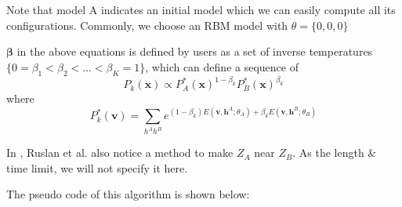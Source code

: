 Note that model A indicates an initial model which we can easily compute all its configurations. Commonly, we choose an RBM model with $\theta = \{0,0,0\}$

$\mathbf \beta$ in the above equations is defined by users as a set of inverse temperatures $\{0= \beta_{1} < \beta_{2} < ... < \beta_{K} =1\}$, which can define a sequence of
\begin{equation}
P_{k}(\mathbf x) \propto P_{A}^{*}(\mathbf x)^{1-\beta_{k}} P_{B}^{*}(\mathbf x)^{\beta_{k}}
\end{equation}
where 
\begin{equation}
P^{*}_{k}(\mathbf v)=\sum_{h^{A}h^{B}}e^{(1-\beta_{k})E(\mathbf v, \mathbf h^{A};\theta_{A})+\beta_{k}E(\mathbf v,\mathbf h^{B};\theta_{B})}
\end{equation}


In \cite{salakhutdinov2009learning}, Ruslan et al. also notice a method to make $Z_{A}$ near $Z_{B}$. As the length \& time limit, we will not specify it here.


The pseudo code of this algorithm is shown below:

